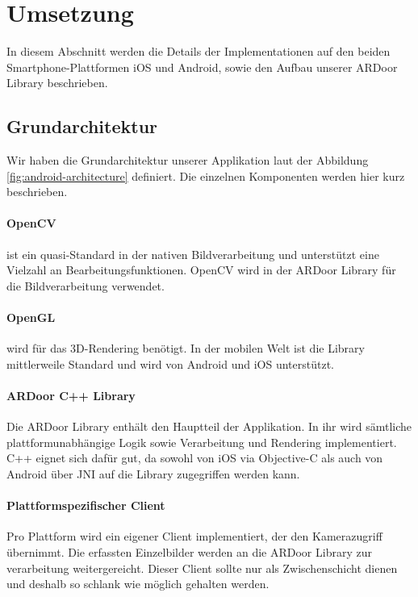 \documentclass[main.tex]{subfiles}
\begin{document}
\section{Umsetzung}
In diesem Abschnitt werden die Details der Implementationen auf den beiden Smartphone-Plattformen iOS und Android, sowie den Aufbau unserer ARDoor Library beschrieben.

\subsection{Grundarchitektur}
Wir haben die Grundarchitektur unserer Applikation laut der Abbildung \ref{fig:android-architecture} definiert. Die einzelnen Komponenten werden hier kurz beschrieben.

\paragraph{OpenCV}
ist ein quasi-Standard in der nativen Bildverarbeitung und unterstützt eine Vielzahl an Bearbeitungsfunktionen. OpenCV wird in der ARDoor Library für die Bildverarbeitung verwendet.

\paragraph{OpenGL}
wird für das 3D-Rendering benötigt. In der mobilen Welt ist die Library mittlerweile Standard und wird von Android und iOS unterstützt.

\paragraph{ARDoor C++ Library}
Die ARDoor Library enthält den Hauptteil der Applikation. In ihr wird sämtliche plattformunabhängige Logik sowie Verarbeitung und Rendering implementiert. C++ eignet sich  dafür gut, da sowohl von iOS via Objective-C als auch von Android über JNI auf die Library zugegriffen werden kann.

\paragraph{Plattformspezifischer Client}
Pro Plattform wird ein eigener Client implementiert, der den Kamerazugriff übernimmt. Die erfassten Einzelbilder werden an die ARDoor Library zur verarbeitung weitergereicht. Dieser Client sollte nur als Zwischenschicht dienen und deshalb so schlank wie möglich gehalten werden. 
\end{document}
